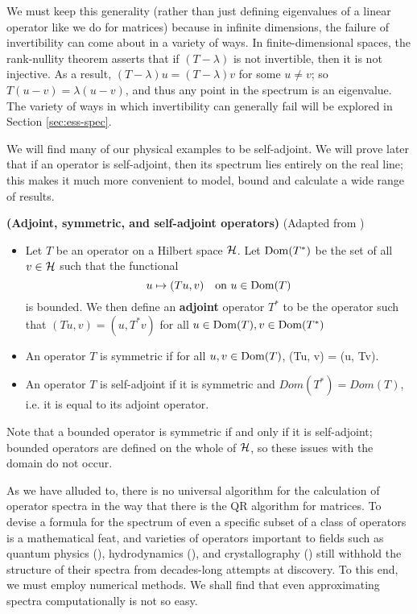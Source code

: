 \documentclass[../main.tex]{subfiles}
\begin{document}
We must keep this generality (rather than just defining eigenvalues of a linear operator like we do for matrices) because in infinite dimensions, the failure of invertibility can come about in a variety of ways. In finite-dimensional spaces, the rank-nullity theorem asserts that if $(T - \lambda)$ is not invertible, then it is not injective. As a result, $(T - \lambda)u = (T - \lambda)v$ for some $u \neq v$; so $T(u - v) = \lambda(u-v)$, and thus any point in the spectrum is an eigenvalue. The variety of ways in which invertibility can generally fail will be explored in Section \ref{sec:ess-spec}.

We will find many of our physical examples to be self-adjoint. We will prove later that if an operator is self-adjoint, then its spectrum lies entirely on the real line; this makes it much more convenient to model, bound and calculate a wide range of results.

\begin{definition}{\textbf{(Adjoint, symmetric, and self-adjoint operators)}} (Adapted from \cite{hall2013quantum})
\begin{itemize}
\item Let $T$ be an operator on a Hilbert space $\mathcal{H}$. Let $\mathrm{Dom}(T^*)$ be the set of all $v \in \mathcal{H}$ such that the functional
$$u \mapsto (Tu, v) \quad \text{on $u \in \mathrm{Dom}(T)$}$$
is bounded. We then define an \textbf{adjoint} operator $T^*$ to be the operator such that $(Tu, v) = (u, T^*v)$ for all $u \in \mathrm{Dom}(T), v \in \mathrm{Dom}(T^*)$
\item An operator $T$ is symmetric if for all $u, v \in \mathrm{Dom}(T)$, (Tu, v) = (u, Tv).
\item An operator $T$ is self-adjoint if it is symmetric and $Dom(T^*) = Dom(T)$, i.e. it is equal to its adjoint operator.
\end{itemize}
\end{definition}
Note that a bounded operator is symmetric if and only if it is self-adjoint; bounded operators are defined on the whole of $\mathcal{H}$, so these issues with the domain do not occur. 

As we have alluded to, there is no universal algorithm for the calculation of operator spectra in the way that there is the QR algorithm \cite{suli2003introduction} for matrices. To devise a formula for the spectrum of even a specific subset of a class of operators is a mathematical
feat, and varieties of operators important to fields such as quantum physics (\cite{lewin2010spectral}), hydrodynamics (\cite{manning2008descriptor}), and crystallography (\cite{cances2012periodic}) still withhold the structure of their spectra from decades-long attempts at discovery. 
To this end, we must employ numerical methods.
We shall find that even approximating spectra computationally is not so easy.
\end{document}
